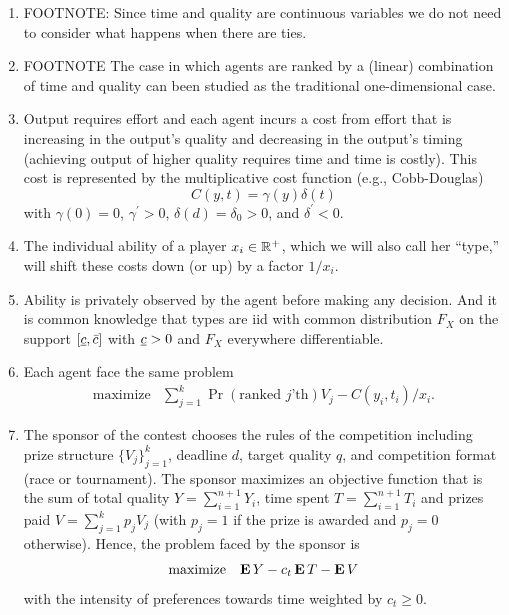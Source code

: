 \documentclass[11pt]{article}
\begin{document}
\begin{enumerate}[label=>>]
\item FOOTNOTE: Since time and quality are continuous variables we do not need to consider what happens when there are ties.
\item FOOTNOTE The case in which agents are ranked by a (linear) combination of time and quality can been studied as the traditional one-dimensional case. 

\item Output requires effort and each agent incurs a cost from effort that is increasing in the output's quality and decreasing in the output's timing (achieving output of higher quality requires time and time is costly). This cost is represented by the multiplicative cost function (e.g., Cobb-Douglas) 
\begin{equation}
  C(y, t) = \gamma(y) \delta(t) 
\end{equation}
with $\gamma(0)=0$, $\gamma^\prime>0$, $\delta(d)=\delta_0>0$, and $\delta^\prime<0$.

\item The individual ability of a player $x_i\in\mathbb{R}^{+}$, which we will also call her ``type,'' will shift these costs down (or up) by a factor $1/x_i$. 

\item Ability is privately observed by the agent before making any decision. And it is common knowledge that types are iid with common distribution $F_X$ on the support $[\underline{c}, \bar{c}]$ with $\underline{c}>0$ and $F_X$ everywhere differentiable.

\item Each agent face the same problem
\begin{equation}
  \begin{array}{ll}
    \mbox{maximize} & \sum_{j=1}^k \Pr(\text{ranked $j$'th}) V_j  - C(y_i, t_i) / x_i.
  \end{array}
\end{equation}

\item The sponsor of the contest chooses the rules of the competition including prize structure $\{V_j\}_{j=1}^k$, deadline $d$, target quality $q$, and competition format (race or tournament). The sponsor maximizes an objective function that is the sum of total quality $Y=\sum_{i=1}^{n+1} Y_i$, time spent $T=\sum_{i=1}^{n+1} T_i$ and prizes paid $V=\sum_{j=1}^k p_{j} V_j$ (with $p_j=1$ if the prize is awarded and $p_j=0$ otherwise). Hence, the problem faced  by the sponsor is
\begin{equation}
  \begin{array}{ll}
    \mbox{maximize} & \mathop{\bf E{}}{Y}  - c_t \mathop{\bf E{}}{T} - \mathop{\bf E{}}{V}
  \end{array}
\end{equation}
with the intensity of preferences towards time weighted by $c_t\geq 0$. 
\end{enumerate}
\end{document}
